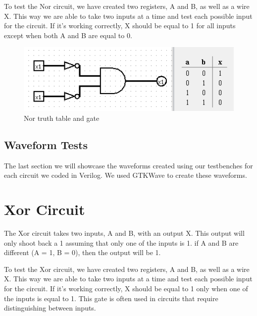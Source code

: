 \documentclass[12pt]{article}
\begin{document}
To test the Nor circuit, we have created two registers, A and B, as well as a wire X. This way we are able to take two inputs at a time and test each possible input for the circuit. If it's working correctly, X should be equal to 1 for all inputs except when both A and B are equal to 0. 


\begin{figure}[h]
    \centering
    \includegraphics[width = 1.0\textwidth]{figs/Nor CircuitTruth.png}
    \caption{Nor truth table and gate}
    \label{fig:enter-label}
\end{figure}

\newpage

\subsection{Waveform Tests}

The last section we will showcase the waveforms created using our testbenches for each circuit we coded in Verilog. We used GTKWave to create these waveforms.







\section{Xor Circuit}
The Xor circuit takes two inputs, A and B, with an output X. This output will only shoot back a 1 assuming that only one of the inputs is 1. if A and B are different (A = 1, B = 0), then the output will be 1. 


To test the Xor circuit, we have created two registers, A and B, as well as a wire X. This way we are able to take two inputs at a time and test each possible input for the circuit. If it's working correctly, X should be equal to 1 only when one of the inputs is equal to 1. This gate is often used in circuits that require distinguishing between inputs.

\end{document}

